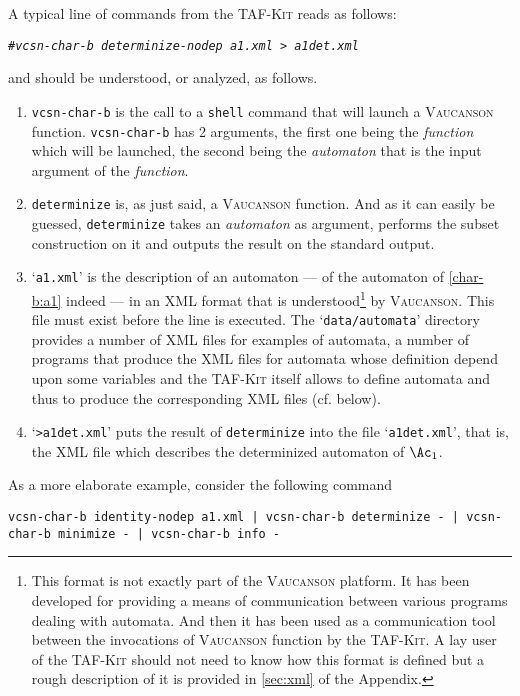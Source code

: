 \documentclass[a4paper]{report}
\newenvironment{shell}
{\begin{alltt}}
{\end{alltt}}
\newcommand\kbd[1]{\textsl{\texttt{#1}}}
\newcommand\file[1]{`\texttt{#1}'}
\newcommand\command[1]{\texttt{#1}}
\newcommand\var[1]{{\ttfamily\itshape #1}}
\newcommand\code[1]{\texttt{#1}}
\newcommand\samp[1]{`\texttt{#1}'}
\newcommand{\taffn}[1]{\code{#1}}
\newcommand{\tafkit}{\textsc{TAF-Kit}\xspace}
\newcommand{\Vauc}{\textsc{Vaucanson}\xspace}
\begin{document}
A typical line of commands from the \tafkit reads as follows:
\begin{shell}
# \kbd{vcsn-char-b determinize-nodep a1.xml > a1det.xml}
\end{shell}
and should be understood, or analyzed, as follows.
\begin{enumerate}
\item \command{vcsn-char-b} is the call to a \command{shell} command
  that will launch a \Vauc function.  \command{vcsn-char-b} has 2
  arguments, the first one being the \var{function} which will be
  launched, the second being the \var{automaton} that is the input
  argument of the \var{function}.

\item \taffn{determinize} is, as just said, a \Vauc function.  And as
  it can easily be guessed, \taffn{determinize} takes an
  \var{automaton} as argument, performs the subset construction on it
  and outputs the result on the standard output.

\item \file{a1.xml} is the description of an automaton --- of the
  automaton of \autoref{char-b:a1} indeed --- in an XML format that is
  understood\footnote{%
    This format is not exactly part of the \Vauc platform.  It has
    been developed for providing a means of communication between
    various programs dealing with automata.  And then it has been used
    as a communication tool between the invocations of \Vauc function
    by the \tafkit.  A lay user of the \tafkit should not need to know
    how this format is defined
    but a rough description of it is provided in \autoref{sec:xml} of
    the Appendix.}
  by \Vauc. This file must exist before the line is executed.  The
  \file{data/automata} directory provides a number of XML files for
  examples of automata, a number of programs that produce the XML
  files for automata whose definition depend upon some variables and
  the \tafkit itself allows to define automata and thus to produce the
  corresponding XML files (cf. below).

\item \samp{>a1det.xml} puts the result of \taffn{determinize} into
  the file \file{a1det.xml}, that is, the XML file which describes the
  determinized automaton of $\Ac_{1}$.
\end{enumerate}

\bigskip

As a more elaborate example, consider the following command

\begin{verbatim}
vcsn-char-b identity-nodep a1.xml | vcsn-char-b determinize - | vcsn-char-b minimize - | vcsn-char-b info -
\end{verbatim}
\end{document}
